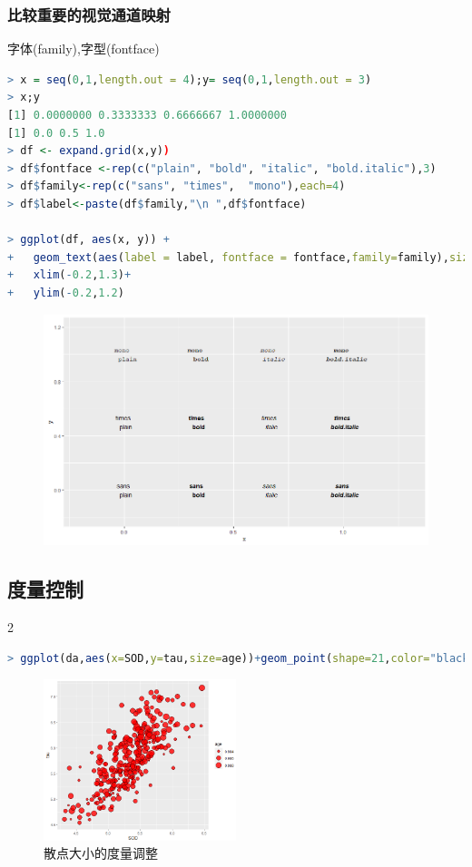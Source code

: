 \documentclass[11pt,a4paper,oneside]{book}
\begin{document}
\subsubsection{比较重要的视觉通道映射}
字体(family),字型(fontface)
\begin{lstlisting}[language=r]
> x = seq(0,1,length.out = 4);y= seq(0,1,length.out = 3)
> x;y
[1] 0.0000000 0.3333333 0.6666667 1.0000000
[1] 0.0 0.5 1.0
> df <- expand.grid(x,y))
> df$fontface <-rep(c("plain", "bold", "italic", "bold.italic"),3)
> df$family<-rep(c("sans", "times",  "mono"),each=4)
> df$label<-paste(df$family,"\n ",df$fontface)

> ggplot(df, aes(x, y)) +
+   geom_text(aes(label = label, fontface = fontface,family=family),size = 4) +
+   xlim(-0.2,1.3)+
+   ylim(-0.2,1.2)
\end{lstlisting}
\begin{figure}[H]
	\centering
	\includegraphics[width=\textwidth]{screenshot034}
\end{figure}

\subsection{度量控制}
\begin{multicols}{2}
\begin{lstlisting}[language=r]
> ggplot(da,aes(x=SOD,y=tau,size=age))+geom_point(shape=21,color="black",fill="#FF0000",stroke=0.25,alpha=0.8)+scale_size(range = c(1,8))
\end{lstlisting}
\begin{figure}[H]
	\centering
	\includegraphics[width=0.5\textwidth]{screenshot021}
	\caption{散点大小的度量调整}
	\label{fig:screenshot021}
\end{figure}
\end{multicols}
\hspace{\fill}
\end{document}
